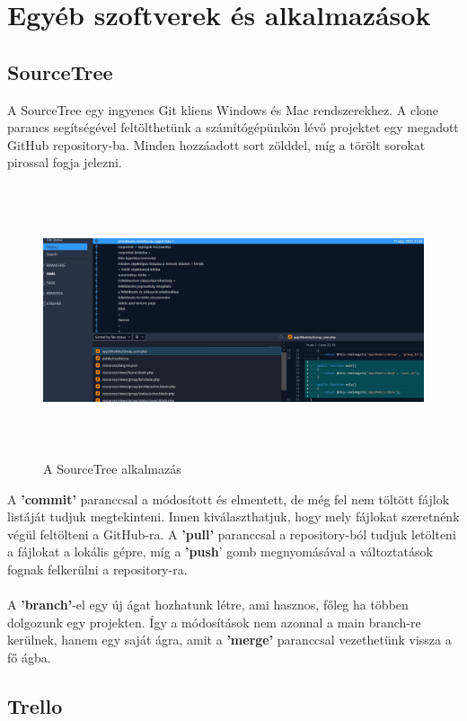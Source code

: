 \documentclass[
]{thesis-ekf}
\theoremstyle{definition}
\theoremstyle{remark}
\begin{document}
\section{Egyéb szoftverek és alkalmazások}
\subsection{SourceTree}

A SourceTree egy ingyenes Git kliens Windows és Mac rendszerekhez. A clone parancs segítségével feltölthetünk a számítógépünkön lévő projektet egy megadott GitHub repository-ba. Minden hozzáadott sort zölddel, míg a törölt sorokat pirossal fogja jelezni. 

\begin{figure}[H]
	\centering
	\includegraphics[width=15cm, height=8cm]{sourcetree}
	\caption{A SourceTree alkalmazás}
	\label{fig:picture}
\end{figure}
\noindent
A \textbf{'commit'} paranccsal a módosított és elmentett, de még fel nem töltött fájlok listáját tudjuk megtekinteni. Innen kiválaszthatjuk, hogy mely fájlokat szeretnénk végül feltölteni a GitHub-ra. A \textbf{'pull'} paranccsal a repository-ból tudjuk letölteni a fájlokat a lokális gépre, míg a \textbf{'push}' gomb megnyomásával a változtatások fognak felkerülni a repository-ra.
\\\\
A \textbf{'branch'}-el egy új ágat hozhatunk létre, ami hasznos, főleg ha többen dolgozunk egy projekten. Így a módosítások nem azonnal a main branch-re kerülnek, hanem egy saját ágra, amit a \textbf{'merge'} paranccsal vezethetünk vissza a fő ágba.

\subsection{Trello}
\end{document}
